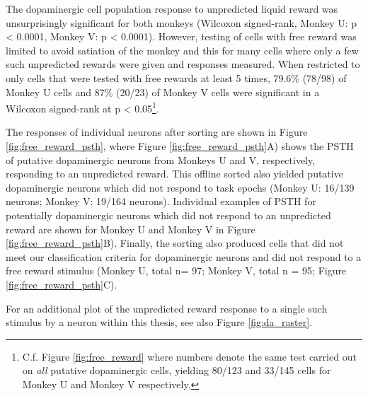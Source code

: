The dopaminergic cell population response to unpredicted liquid reward was unsurprisingly significant for both monkeys (Wilcoxon signed-rank, Monkey U: p < 0.0001, Monkey V: p < 0.0001). However, testing of cells with free reward was limited to avoid satiation of the monkey and this for many cells where only a few such unpredicted rewards were given and responses measured. When restricted to only cells that were tested with free rewards at least 5 times, 79.6\% (78/98) of Monkey U cells and 87\% (20/23) of Monkey V cells were significant in a Wilcoxon signed-rank at p < 0.05\footnote{C.f. Figure \ref{fig:free_reward} where numbers denote the same test carried out on \textit{all} putative dopaminergic cells, yielding 80/123 and 33/145 cells for Monkey U and Monkey V respectively.}.

The responses of individual neurons after sorting are shown in Figure \ref{fig:free_reward_psth}, where Figure \ref{fig:free_reward_psth}A) shows the PSTH of putative dopaminergic neurons from Monkeys U and V, respectively, responding to an unpredicted reward. This offline sorted also yielded putative dopaminergic neurons which did not respond to task epochs (Monkey U: 16/139 neurons; Monkey V: 19/164 neurons). Individual examples of PSTH for potentially dopaminergic neurons which did not respond to an unpredicted reward are shown for Monkey U and Monkey V in Figure \ref{fig:free_reward_psth}B). Finally, the sorting also produced cells that did not meet our classification criteria for dopaminergic neurons and did not respond to a free reward stimulus (Monkey U, total n= 97; Monkey V, total n = 95; Figure \ref{fig:free_reward_psth}C).

For an additional plot of the unpredicted reward response to a single such stimulus by a neuron within this thesis, see also Figure \ref{fig:da_raster}.

